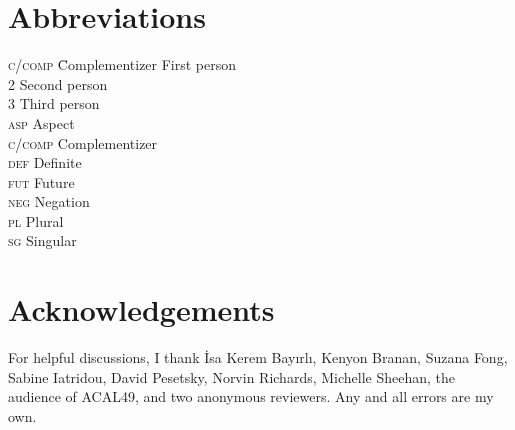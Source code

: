 \documentclass[output=paper,colorlinks,citecolor=brown]{langscibook}
\begin{document}
\section*{Abbreviations}
\begin{multicols}{2}
\begin{tabbing}
  \textsc{c/comp} \hspace{1ex} \= Complementizer \> First person \\
  2 \> Second person \\
  3 \> Third  person \\
  \textsc{asp}    \> Aspect \\
  \textsc{c/comp} \> Complementizer\\
  \textsc{def} \> Definite \\
  \textsc{fut} \> Future \\
  \textsc{neg} \> Negation \\
  \textsc{pl}  \> Plural \\
  \textsc{sg}  \> Singular  
\end{tabbing}
\end{multicols}

\section*{Acknowledgements}
For helpful discussions, I thank İsa Kerem Bayırlı, Kenyon Branan, Suzana Fong, Sabine Iatridou, David Pesetsky, Norvin Richards, Michelle Sheehan, the audience of ACAL49, and two anonymous reviewers. Any and all errors are my own.

{\sloppy\printbibliography[heading=subbibliography,notkeyword=this]}
\end{document}
